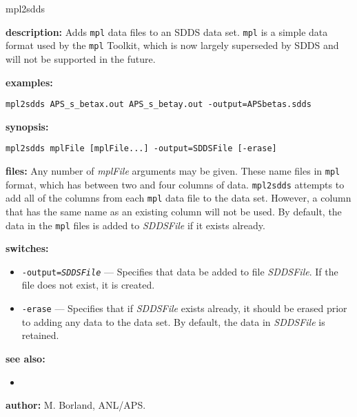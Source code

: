 \begin{sddsprog}{mpl2sdds}
  \item \textbf{description:} Adds \verb|mpl| data files to an SDDS data set.
    \verb|mpl| is a simple data format used by the \verb|mpl| Toolkit, which is now largely
    superseded by SDDS and will not be supported in the future.
  \item \textbf{examples:}
    \begin{verbatim}
mpl2sdds APS_s_betax.out APS_s_betay.out -output=APSbetas.sdds
    \end{verbatim}
  \item \textbf{synopsis:}
    \begin{verbatim}
mpl2sdds mplFile [mplFile...] -output=SDDSFile [-erase]
    \end{verbatim}
  \item \textbf{files:}
    Any number of {\em mplFile} arguments may be given. These name files in {\tt mpl} format, which
    has between two and four columns of data. \verb|mpl2sdds| attempts to add all of the columns from
    each \verb|mpl| data file to the data set. However, a column that has the same name as an existing
    column will not be used. By default, the data in the {\tt mpl} files is added to {\em SDDSFile} if
    it exists already.
  \item \textbf{switches:}
    \begin{itemize}
      \item {\tt -output={\em SDDSFile}} --- Specifies that data be added to file {\em SDDSFile}. If the file does not exist, it is created.
      \item \verb|-erase| --- Specifies that if {\em SDDSFile} exists already, it should be erased prior to adding any data to the data set. By default, the data in {\em SDDSFile} is retained.
    \end{itemize}
  \item \textbf{see also:}
    \begin{itemize}
      \item {}
    \end{itemize}
  \item \textbf{author:} M. Borland, ANL/APS.
\end{sddsprog}

